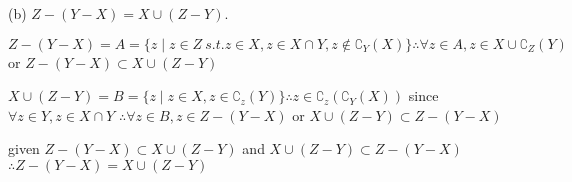 (b) $Z - (Y - X ) = X \cup (Z - Y)$.


$Z - (Y - X) =A =  \{ z \mid z \in Z \ s.t. z \in X, z \in X \cap Y, z \not \in \complement_{Y}(X)\} \therefore \forall z \in A, z \in X \cup \complement_{Z}(Y)$ or $Z - (Y - X ) \subset X \cup (Z - Y)$ 

$X \cup (Z - Y) = B = \{z \mid z \in X, z  \in  \complement_{z}(Y)\} \therefore z \in \complement_{z}(\complement_{Y}(X)) $ since $\forall z \in Y, z\in X \cap Y$ $\therefore \forall z \in B, z\in Z - (Y-X)$ or $X \cup (Z - Y) \subset Z - (Y - X )$

given $Z - (Y - X ) \subset X \cup (Z - Y)$ and $X \cup (Z - Y) \subset Z - (Y - X )$ $\therefore Z - (Y - X ) = X \cup (Z - Y)$






